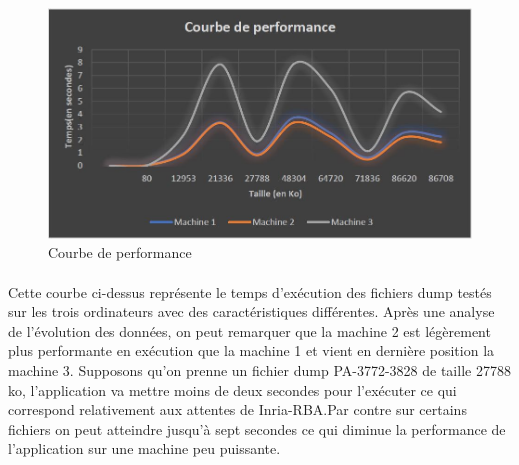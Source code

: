 \documentclass[a4paper, 12pt]{book}
\begin{document}
\begin{figure}[ht!]
\centering
\includegraphics[scale=0.7]{performance_courbe.JPG}
\caption{Courbe de performance}
\label{courbe}
\end{figure}
\paragraph{}
Cette courbe ci-dessus représente le temps d’exécution des fichiers dump testés sur les trois ordinateurs avec des caractéristiques différentes.
\newline
Après une analyse de l'évolution des données, on peut remarquer que la machine 2 est légèrement plus performante en exécution que la machine 1 et vient en dernière position la machine 3.
\newline
Supposons qu'on prenne un fichier dump PA-3772-3828 de taille 27788 ko, l'application va mettre moins de deux secondes pour l’exécuter ce qui correspond relativement aux attentes de Inria-RBA.Par contre sur certains fichiers on peut atteindre jusqu'à sept secondes ce qui diminue la performance de l'application sur une machine peu puissante.





\end{document}
